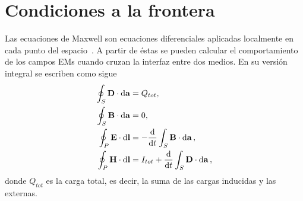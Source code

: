 \section{Condiciones a la frontera}
Las ecuaciones de Maxwell son ecuaciones diferenciales aplicadas localmente en cada punto del espacio~\cite{jackson1999electrodynamics}. A partir de éstas se pueden calcular el comportamiento de los campos EMs cuando cruzan la interfaz entre dos medios. En su versión integral se escriben como sigue~\cite{griffiths2013electrodynamics}
\begin{subequations}
	\begin{align}
	\oint_{S}\vb{D}\cdot\dd{\vb{a}}&=Q_{tot},\label{MaxwellInt1}\\
	\oint_{S}\vb{B}\cdot\dd{\vb{a}}&=0,\label{MaxwellInt2}\\
	\oint_{P}\vb{E}\cdot\dd{\vb{l}} &=- \dv{}{t}\int_{S}\vb{B}\cdot\dd{\vb{a}},\label{MaxwellInt3}\\
	\oint_{P}\vb{H}\cdot\dd{\vb{l}}&=I_{tot}+\dv{}{t}\int_{S}\vb{D}\cdot\dd{\vb{a}}\label{eq:MaxwellInt4},
	\end{align}
\end{subequations}
donde $Q_{tot}$ es la carga total, es decir, la suma de las cargas inducidas y las externas.\\

